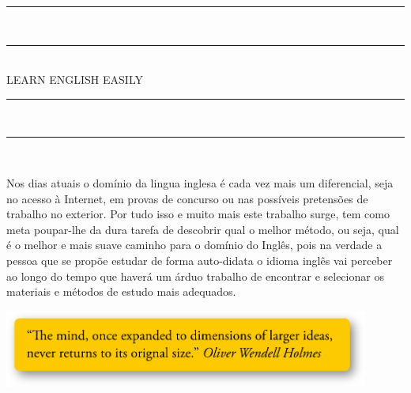 \documentclass[a4paper,12pt,openany,]{book}
\begin{document}

\thispagestyle{empty}
\begin{center}

\rule{10cm}{1.5mm}\\ \vspace{-.7\baselineskip}
\rule{10cm}{.3mm}\\ \vspace{.5\baselineskip}
{\textsc {\Huge LEARN ENGLISH EASILY}}\\ \vspace{-.4\baselineskip}
\rule{10cm}{.3mm}\\ \vspace{-.5\baselineskip}
\rule{10cm}{1.5mm}\\

\vspace{5cm}
\begin{flushright}
\begin{minipage}[t]{12cm}

	{\small Nos dias atuais o domínio da lingua inglesa é cada vez mais um diferencial,
	seja no acesso à Internet, em provas de concurso ou nas possíveis pretensões de
	trabalho no exterior. Por tudo isso e muito mais este trabalho surge, tem como
	meta poupar-lhe da dura tarefa de descobrir qual o melhor método, ou seja, qual
	é o melhor e mais suave caminho para o domínio do Inglês, pois na verdade
	a pessoa que se propõe estudar de forma auto-didata o idioma inglês vai
	perceber ao longo do tempo que haverá um árduo trabalho de encontrar
    e selecionar os materiais e métodos de estudo mais adequados.} \vspace{1cm}


    \includegraphics[width=12cm]{oliver}



\end{minipage}
\end{flushright}
\end{center}
\end{document}

